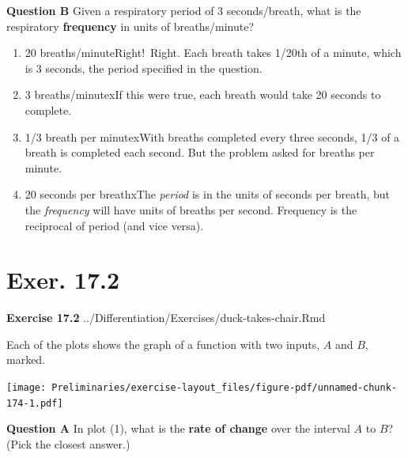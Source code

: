 \documentclass[
  letterpaper,
  DIV=11,
  numbers=noendperiod,
  oneside]{article}
\providecommand{\tightlist}{%
  \setlength{\itemsep}{0pt}\setlength{\parskip}{0pt}}\usepackage{longtable,booktabs,array}
\begin{document}
\begin{multicols}{2}
\textbf{Question B} Given a respiratory period of 3 seconds/breath, what
is the respiratory \textbf{frequency} in units of breaths/minute?

\begin{enumerate}
\def\labelenumi{\roman{enumi}.}
\tightlist
\item
  {20 breaths/minute{Right!~Right. Each breath takes 1/20th of a minute,
  which is 3 seconds, the period specified in the question.}}\\
\item
  {3 breaths/minute{xIf this were true, each breath would take 20
  seconds to complete.}}\\
\item
  {1/3 breath per minute{xWith breaths completed every three seconds,
  1/3 of a breath is completed each second. But the problem asked for
  breaths per minute.}}\\
\item
  {20 seconds per breath{xThe \emph{period} is in the units of seconds
  per breath, but the \emph{frequency} will have units of breaths per
  second. Frequency is the reciprocal of period (and vice versa).}}
\end{enumerate}

\hypertarget{exer.-17.2}{%
\section*{Exer. 17.2}\label{exer.-17.2}}

\textbf{Exercise 17.2} ../Differentiation/Exercises/duck-takes-chair.Rmd

Each of the plots shows the graph of a function with two inputs, \(A\)
and \(B\), marked.

\texttt{[image: Preliminaries/exercise-layout\_files/figure-pdf/unnamed-chunk-174-1.pdf]}

\textbf{Question A} In plot (1), what is the \textbf{rate of change}
over the interval \(A\) to \(B\)? (Pick the closest answer.)


\end{multicols}
\end{document}
